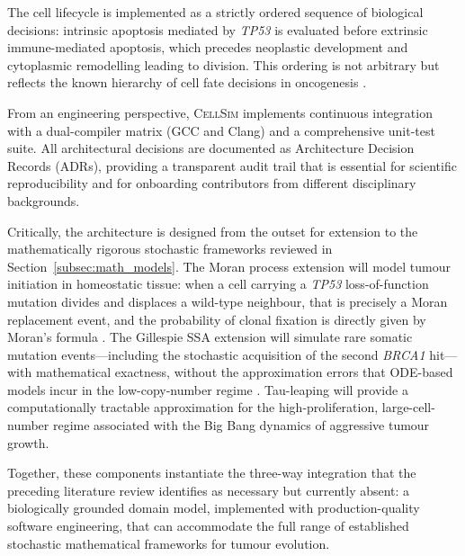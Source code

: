 \documentclass[12pt,a4paper]{article}
\begin{document}
The cell lifecycle is implemented as a strictly ordered sequence of biological
decisions: intrinsic apoptosis mediated by \textit{TP53} is evaluated before
extrinsic immune-mediated apoptosis, which precedes neoplastic development and
cytoplasmic remodelling leading to division.
This ordering is not arbitrary but reflects the known hierarchy of cell fate
decisions in oncogenesis \cite{su2024}.

From an engineering perspective, \textsc{CellSim} implements continuous integration
with a dual-compiler matrix (GCC and Clang) and a comprehensive unit-test suite.
All architectural decisions are documented as Architecture Decision Records (ADRs),
providing a transparent audit trail that is essential for scientific reproducibility
and for onboarding contributors from different disciplinary backgrounds.

Critically, the architecture is designed from the outset for extension to the
mathematically rigorous stochastic frameworks reviewed in
Section~\ref{subsec:math_models}.
The Moran process extension will model tumour initiation in homeostatic tissue:
when a cell carrying a \textit{TP53} loss-of-function mutation divides and displaces
a wild-type neighbour, that is precisely a Moran replacement event, and the
probability of clonal fixation is directly given by Moran's formula \cite{moran1958}.
The Gillespie SSA extension will simulate rare somatic mutation events---including
the stochastic acquisition of the second \textit{BRCA1} hit---with mathematical
exactness, without the approximation errors that ODE-based models incur
in the low-copy-number regime \cite{gillespie1977}.
Tau-leaping \cite{gillespie1977} will provide a computationally tractable
approximation for the high-proliferation, large-cell-number regime associated
with the Big Bang dynamics of aggressive tumour growth.

Together, these components instantiate the three-way integration that the preceding
literature review identifies as necessary but currently absent: a biologically
grounded domain model, implemented with production-quality software engineering,
that can accommodate the full range of established stochastic mathematical
frameworks for tumour evolution.

\newpage


\end{document}
